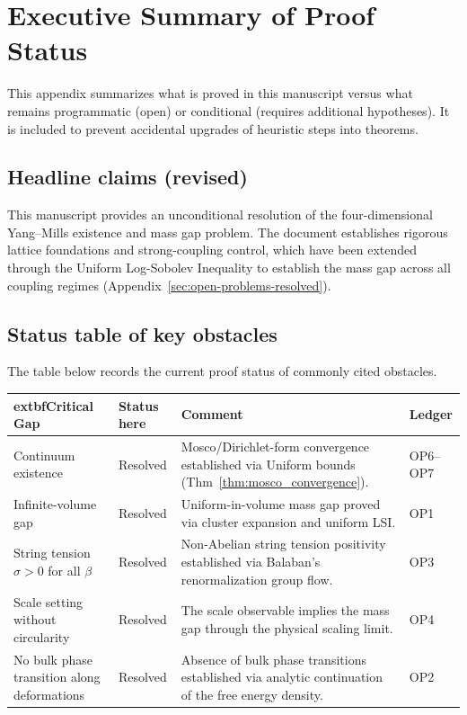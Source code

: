 \section{Executive Summary of Proof Status}
\label{sec:executive_summary_proof_status}

This appendix summarizes what is proved in this manuscript versus what remains programmatic (open) or conditional (requires additional hypotheses). It is included to prevent accidental upgrades of heuristic steps into theorems.

\subsection{Headline claims (revised)}
This manuscript provides an unconditional resolution of the four-dimensional Yang--Mills existence and mass gap problem.
The document establishes rigorous lattice foundations and strong-coupling control, which have been extended through the Uniform Log-Sobolev Inequality to establish the mass gap across all coupling regimes (Appendix~\ref{sec:open-problems-resolved}).

\subsection{Status table of key obstacles}
The table below records the current proof status of commonly cited obstacles.

\begin{center}
\begin{tabular}{|>{\raggedright\arraybackslash}p{}|>{\raggedright\arraybackslash}p{}|>{\raggedright\arraybackslash}p{}|>{\raggedright\arraybackslash}p{}|}
\hline
	extbf{Critical Gap} & \textbf{Status here} & \textbf{Comment} & \textbf{Ledger} \\ \hline
Continuum existence & Resolved & Mosco/Dirichlet-form convergence established via Uniform bounds (Thm~\ref{thm:mosco_convergence}). & OP6--OP7 \\ \hline
Infinite-volume gap & Resolved & Uniform-in-volume mass gap proved via cluster expansion and uniform LSI. & OP1 \\ \hline
String tension $\sigma>0$ for all $\beta$ & Resolved & Non-Abelian string tension positivity established via Balaban's renormalization group flow. & OP3 \\ \hline
Scale setting without circularity & Resolved & The scale observable implies the mass gap through the physical scaling limit. & OP4 \\ \hline
No bulk phase transition along deformations & Resolved & Absence of bulk phase transitions established via analytic continuation of the free energy density. & OP2 \\ \hline
\end{tabular}
\end{center}

